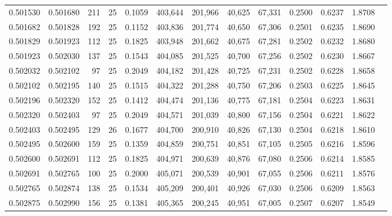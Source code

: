 \begin{tabular}{rrrrrrrrrrrrr}
0.501530 & 0.501680 &   211 &  25 &                                     0.1059 & 403,644 & 201,966 &  40,625 &  67,331 & 0.2500 & 0.6237 & 1.8708 \\
0.501682 & 0.501828 &   192 &  25 &                                     0.1152 & 403,836 & 201,774 &  40,650 &  67,306 & 0.2501 & 0.6235 & 1.8690 \\
0.501829 & 0.501923 &   112 &  25 &                                     0.1825 & 403,948 & 201,662 &  40,675 &  67,281 & 0.2502 & 0.6232 & 1.8680 \\
0.501923 & 0.502030 &   137 &  25 &                                     0.1543 & 404,085 & 201,525 &  40,700 &  67,256 & 0.2502 & 0.6230 & 1.8667 \\
0.502032 & 0.502102 &    97 &  25 &                                     0.2049 & 404,182 & 201,428 &  40,725 &  67,231 & 0.2502 & 0.6228 & 1.8658 \\
0.502102 & 0.502195 &   140 &  25 &                                     0.1515 & 404,322 & 201,288 &  40,750 &  67,206 & 0.2503 & 0.6225 & 1.8645 \\
0.502196 & 0.502320 &   152 &  25 &                                     0.1412 & 404,474 & 201,136 &  40,775 &  67,181 & 0.2504 & 0.6223 & 1.8631 \\
0.502320 & 0.502403 &    97 &  25 &                                     0.2049 & 404,571 & 201,039 &  40,800 &  67,156 & 0.2504 & 0.6221 & 1.8622 \\
0.502403 & 0.502495 &   129 &  26 &                                     0.1677 & 404,700 & 200,910 &  40,826 &  67,130 & 0.2504 & 0.6218 & 1.8610 \\
0.502495 & 0.502600 &   159 &  25 &                                     0.1359 & 404,859 & 200,751 &  40,851 &  67,105 & 0.2505 & 0.6216 & 1.8596 \\
0.502600 & 0.502691 &   112 &  25 &                                     0.1825 & 404,971 & 200,639 &  40,876 &  67,080 & 0.2506 & 0.6214 & 1.8585 \\
0.502691 & 0.502765 &   100 &  25 &                                     0.2000 & 405,071 & 200,539 &  40,901 &  67,055 & 0.2506 & 0.6211 & 1.8576 \\
0.502765 & 0.502874 &   138 &  25 &                                     0.1534 & 405,209 & 200,401 &  40,926 &  67,030 & 0.2506 & 0.6209 & 1.8563 \\
0.502875 & 0.502990 &   156 &  25 &                                     0.1381 & 405,365 & 200,245 &  40,951 &  67,005 & 0.2507 & 0.6207 & 1.8549 \\

\end{tabular}
